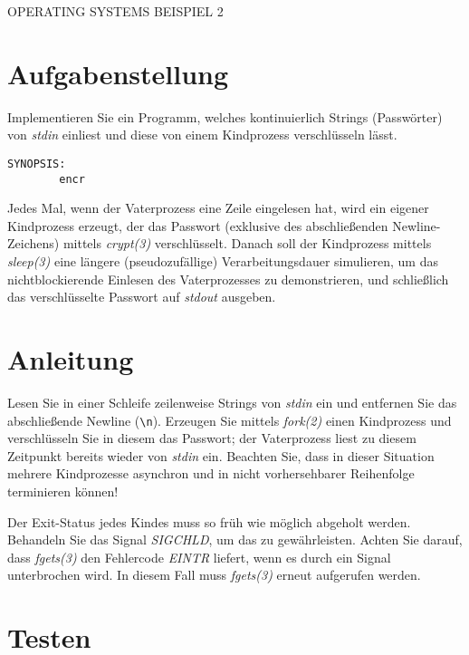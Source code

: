 \documentclass{article}
\begin{document}
\begin{center}
\begin{Large}
OPERATING SYSTEMS BEISPIEL 2
\end{Large}
\end{center}




\section*{Aufgabenstellung}

Implementieren Sie ein Programm, welches kontinuierlich Strings
(Passwörter) von \emph{stdin} einliest und diese von einem Kindprozess
verschlüsseln lässt.

\begin{verbatim}
SYNOPSIS:
        encr
\end{verbatim}

Jedes Mal, wenn der Vaterprozess eine Zeile eingelesen hat, wird ein
eigener Kindprozess erzeugt, der das Passwort (exklusive des
abschließenden Newline-Zeichens) mittels \emph{crypt(3)}
verschlüsselt. Danach soll der Kindprozess mittels \emph{sleep(3)}
eine längere (pseudozufällige) Verarbeitungsdauer simulieren, um das
nichtblockierende Einlesen des Vaterprozesses zu demonstrieren, und
schließlich das verschlüsselte Passwort auf \emph{stdout} ausgeben.

\section*{Anleitung}

Lesen Sie in einer Schleife zeilenweise Strings von \emph{stdin} ein
und entfernen Sie das abschließende Newline (\verb+\n+). Erzeugen Sie
mittels \emph{fork(2)} einen Kindprozess und verschlüsseln Sie in
diesem das Passwort; der Vaterprozess liest zu diesem Zeitpunkt
bereits wieder von \emph{stdin} ein. Beachten Sie, dass in dieser
Situation mehrere Kindprozesse asynchron und in nicht vorhersehbarer
Reihenfolge terminieren können!

Der Exit-Status jedes Kindes muss so früh wie möglich abgeholt werden.
Behandeln Sie das Signal {\em SIGCHLD}, um das zu gewährleisten.
Achten Sie darauf, dass {\em fgets(3)} den Fehlercode {\em EINTR}
liefert, wenn es durch ein Signal unterbrochen wird. In diesem Fall
muss {\em fgets(3)} erneut aufgerufen werden.

\section*{Testen}
\end{document}
